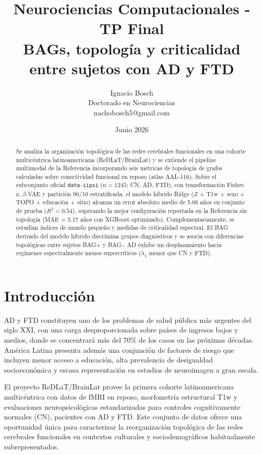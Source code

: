 \documentclass[12pt,a4paper]{article}
\title{
  \large Neurociencias Computacionales - TP Final \\[0.5em]
  \LARGE BAGs, topología y criticalidad entre sujetos con AD y FTD \\
  
}
\author{
  Ignacio Bosch \\
  \small Doctorado en Neurociencias \\
  \small nachobosch5@gmail.com
}
\date{Junio 2026}
\begin{document}
\maketitle
\thispagestyle{empty}

\begin{abstract}
Se analiza la organización topológica de las redes cerebrales funcionales en una cohorte multicéntrica latinoamericana (ReDLaT/BrainLat) y se extiende el pipeline multimodal de la Referencia\cite{bazan2026} incorporando seis métricas de topología de grafos calculadas sobre conectividad funcional en reposo (atlas AAL-116). Sobre el subconjunto oficial \texttt{data-iipsi} ($n = 1245$; CN, AD, FTD), con transformación Fisher-z, $\beta$-VAE y partición 90/10 estratificada, el modelo híbrido Ridge ($Z$ + T1w + sexo + TOPO + educación + sitio) alcanza un error absoluto medio de 5.06 años en conjunto de prueba ($R^2 = 0.54$), superando la mejor configuración reportada en la Referencia sin topología (MAE = 5.17 años con XGBoost optimizado). Complementariamente, se estudian índices de mundo pequeño y medidas de criticalidad espectral. El BAG derivado del modelo híbrido discrimina grupos diagnósticos y se asocia con diferencias topológicas entre sujetos BAG+ y BAG-. AD exhibe un desplazamiento hacia regímenes espectralmente menos supercríticos ($\lambda_1$ menor que CN y FTD).
\end{abstract}

\section{Introducción}

AD y FTD constituyen uno de los problemas de salud pública más urgentes del siglo XXI,
con una carga desproporcionada sobre países de ingresos bajos y medios, donde se concentrará
más del 70\% de los casos en las próximas décadas. América Latina presenta además una conjunción
de factores de riesgo que incluyen menor acceso a educación, alta prevalencia de desigualdad
socioeconómica y escasa representación en estudios de neuroimagen a gran escala.

El proyecto ReDLaT/BrainLat provee la primera cohorte latinoamericana multicéntrica con datos
de fMRI en reposo, morfometría estructural T1w y evaluaciones neuropsicológicas estandarizadas
para controles cognitivamente normales (CN), pacientes con AD y FTD. Este conjunto de datos ofrece una oportunidad única para
caracterizar la reorganización topológica de las redes cerebrales funcionales en contextos
culturales y sociodemográficos habitualmente subrepresentados.
\end{document}
